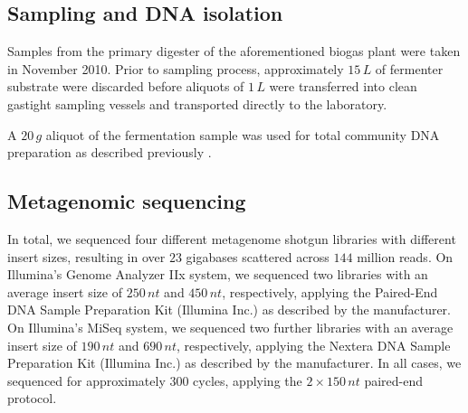 \documentclass{bmcart}
\begin{document}
\subsection*{Sampling and DNA isolation}
Samples from the primary digester of the aforementioned biogas plant were taken in November 2010.
Prior to sampling process, approximately $15\,L$ of fermenter substrate were discarded before aliquots of $1\,L$ were transferred into clean gastight sampling vessels and transported directly to the laboratory.

A $20\,g$ aliquot of the fermentation sample was used for total community DNA preparation as described previously \cite{SchlueterBiogas}.
%
\subsection*{Metagenomic sequencing}
In total, we sequenced four different metagenome shotgun libraries with different insert sizes, resulting in over $23$ gigabases scattered across $144$ million reads.
On Illumina's Genome Analyzer IIx system, we sequenced two libraries with an average insert size of $250\,nt$ and $450\,nt$, respectively, applying the Paired-End DNA Sample Preparation Kit (Illumina Inc.) as described by the manufacturer.
On Illumina's MiSeq system, we sequenced two further libraries with an average insert size of $190\,nt$ and $690\,nt$, respectively, applying the Nextera DNA Sample Preparation Kit (Illumina Inc.) as described by the manufacturer.
In all cases, we sequenced for approximately 300 cycles, applying the $2 \times 150\,nt$ paired-end protocol.
%
\end{document}
